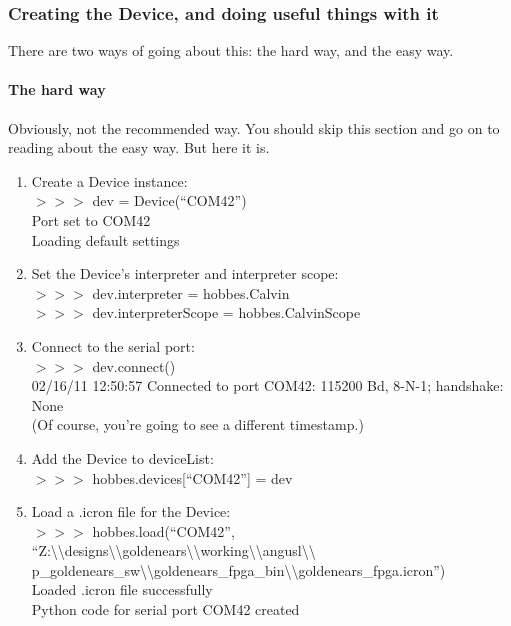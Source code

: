 %
%
\subsubsection{Creating the Device, and doing useful things with it}
\label{3.2.1}

There are two ways of going about this: the hard way, and the easy way.

\setcounter{paragraph}{-1}



%
%
\paragraph{The hard way}
\label{3.2.1.0}

Obviously, not the recommended way. You should skip this section and go on to reading about the easy way. But here it is.

\begin{enumerate}
\item Create a Device instance:\\
$>>>$ dev = Device(``COM42'')\\
Port set to COM42\\
Loading default settings

\item Set the Device's interpreter and interpreter scope:\\
$>>>$ dev.interpreter = hobbes.Calvin\\
$>>>$ dev.interpreterScope = hobbes.CalvinScope

\item Connect to the serial port:\\
$>>>$ dev.connect()\\
02/16/11 12:50:57 Connected to port COM42: 115200 Bd, 8-N-1; handshake: None\\
(Of course, you're going to see a different timestamp.)

\item Add the Device to deviceList:\\
$>>>$ hobbes.devices[``COM42''] = dev

\item Load a .icron file for the Device:\\
$>>>$ hobbes.load(``COM42'', ``Z:\textbackslash \textbackslash designs\textbackslash \textbackslash goldenears\textbackslash \textbackslash working\textbackslash \textbackslash angusl\textbackslash \textbackslash \\
p\_goldenears\_sw\textbackslash \textbackslash goldenears\_fpga\_bin\textbackslash \textbackslash goldenears\_fpga.icron'')\\
Loaded .icron file successfully\\
Python code for serial port COM42 created
\end{enumerate}



